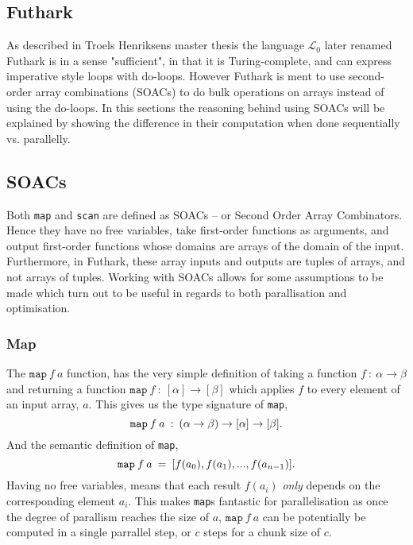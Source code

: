 \documentclass[11pt]{article}
\begin{document}
\subsection{Futhark}
As described in Troels Henriksens master thesis \cite[The $\mathcal{L}_0$ language, p. 8]{MasterTroels} the language $\mathcal{L}_0$ later renamed Futhark is in a sense "sufficient", in that it is Turing-complete, and can express imperative style loops with do-loops. However Futhark is ment to use second-order array combinations (SOACs) to do bulk operations on arrays instead of using the do-loops. In this sections the reasoning behind using SOACs will be explained by showing the difference in their computation when done sequentially vs. parallelly.
\subsection{SOACs}
Both \texttt{map} and \texttt{scan} are defined as SOACs -- or Second Order Array Combinators. Hence they have no free variables, take first-order functions as arguments, and output first-order
 functions whose domains are arrays of the domain of the input. Furthermore, in Futhark, these array inputs and outputs are tuples of arrays, and not arrays of tuples. Working with SOACs allows for some assumptions to be made which turn out to be useful in regards to both parallisation and optimisation.

\subsubsection{Map}
The $\texttt{map} \: f \: a$ function, has the very simple definition of taking a function $f \: : \: \alpha \to \beta$ and returning a function $\mathtt{map} \:f \: : \: [\alpha] \to [\beta]$  which
 applies $f$ to every element of an input array, $a$.  This gives us the type signature of \texttt{map},
$$\mathtt{map} \: f \: a \: :  \: (\alpha \to \beta) \to [\alpha] \to [\beta]\mathnormal{.}$$
And the semantic definition of \texttt{map},
$$\mathtt{map} \: f \: a \: =  \: [f(a_0), f(a_1), ..., f(a_{n-1})]\mathnormal{.}$$
Having no free variables, means that each result $f(a_i)$ \textit{only} depends on the corresponding element $a_i$. This makes \texttt{map}s fantastic for parallelisation as once the
 degree of parallism reaches the size of $a$, $\mathtt{map} \: f \: a$ can be potentially be computed in a single parrallel step, or $c$ steps for a chunk size of $c$.
\end{document}
